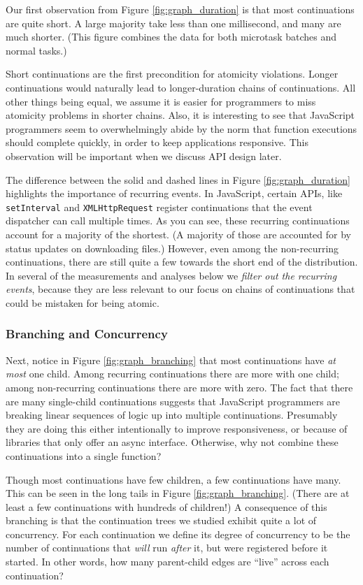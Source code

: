 \documentclass[acmsmall,anonymous,review]{acmart}\settopmatter{printfolios=true,printccs=false,printacmref=false}
\begin{document}
Our first observation from Figure \ref{fig:graph_duration} is that most continuations are quite short.
A large majority take less than one millisecond, and many are much shorter.
(This figure combines the data for both microtask batches and normal tasks.)

Short continuations are the first precondition for atomicity violations.
Longer continuations would naturally lead to longer-duration chains of continuations.
All other things being equal, we assume it is easier for programmers to miss atomicity problems in shorter chains.
Also, it is interesting to see that JavaScript programmers seem to overwhelmingly abide by the norm that function executions should complete quickly, in order to keep applications responsive.
This observation will be important when we discuss API design later.

The difference between the solid and dashed lines in Figure \ref{fig:graph_duration} highlights the importance of recurring events.
In JavaScript, certain APIs, like \texttt{setInterval} and \texttt{XMLHttpRequest} register continuations that the event dispatcher can call multiple times.
As you can see, these recurring continuations account for a majority of the shortest.
(A majority of those are accounted for by status updates on downloading files.)
However, even among the non-recurring continuations, there are still quite a few towards the short end of the distribution.
In several of the measurements and analyses below we \emph{filter out the recurring events}, because they are less relevant to our focus on chains of continuations that could be mistaken for being atomic.

\subsubsection{Branching and Concurrency}

Next, notice in Figure \ref{fig:graph_branching} that most continuations have \emph{at most} one child.
Among recurring continuations there are more with one child; among non-recurring continuations there are more with zero.
The fact that there are many single-child continuations suggests that JavaScript programmers are breaking linear sequences of logic up into multiple continuations.
Presumably they are doing this either intentionally to improve responsiveness, or because of libraries that only offer an async interface.
Otherwise, why not combine these continuations into a single function?

Though most continuations have few children, a few continuations have many.
This can be seen in the long tails in Figure \ref{fig:graph_branching}.
(There are at least a few continuations with hundreds of children!)
A consequence of this branching is that the continuation trees we studied exhibit quite a lot of concurrency.
For each continuation we define its degree of concurrency to be the number of continuations that \emph{will} run \emph{after} it, but were registered before it started.
In other words, how many parent-child edges are ``live'' across each continuation?
\end{document}
